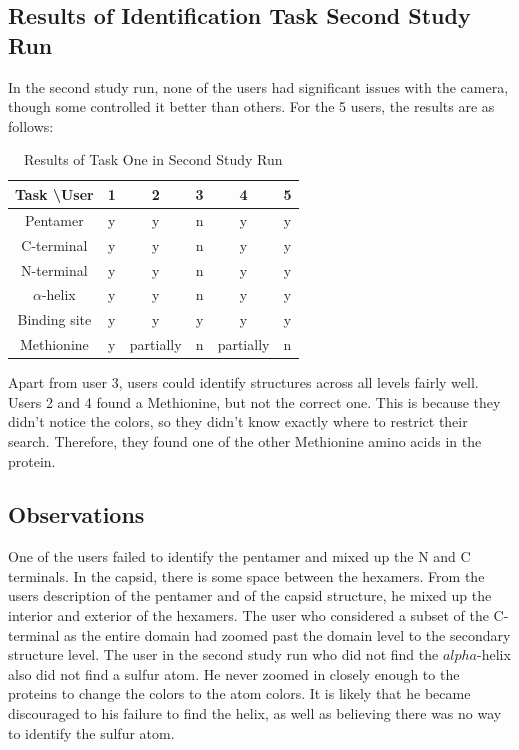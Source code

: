 \documentclass[review,journal]{vgtc}         %
\begin{document}
	\subsection{Results of Identification Task Second Study Run}
	In the second study run, none of the users had significant issues with the camera, though some controlled it better than others.
	For the 5 users, the results are as follows:
	\begin{table}
		
		\centering
		\begin{tabular}{| c | c | c | c | c | c |}
			\hline
			Task \textbackslash User & 1 & 2 & 3 & 4 & 5 \\
			\hline
			Pentamer       & y & y & n & y & y\\
			\hline
			C-terminal     & y & y & n & y & y \\
			\hline
			N-terminal     & y & y & n & y & y  \\
			\hline
			$\alpha$-helix & y & y & n & y & y \\
			\hline
			Binding site   & y & y & y & y & y \\
			\hline
			Methionine      & y & partially & n & partially & n  \\
			\hline
		\end{tabular}
		\caption{Results of Task One in Second Study Run}
	\end{table}
	Apart from user 3, users could identify structures across all levels fairly well. 
	Users 2 and 4 found a Methionine, but not the correct one. 
	This is because they didn't notice the colors, so they didn't know exactly where to restrict their search.
	Therefore, they found one of the other Methionine amino acids in the protein.
	
	
	\subsection{Observations}
	One of the users failed to identify the pentamer and mixed up the N and C terminals. 
	In the capsid, there is some space between the hexamers. 
	From the users description of the pentamer and of the capsid structure, he mixed up the interior and exterior of the hexamers. 
	The user who considered a subset of the C-terminal as the entire domain had zoomed past the domain level to the secondary structure level.
	The user in the second study run who did not find the $alpha$-helix also did not find a sulfur atom. He never zoomed in closely enough to the proteins to change the colors to the atom colors. It is likely that he became discouraged to his failure to find the helix, as well as believing there was no way to identify the sulfur atom.
	
\end{document}
